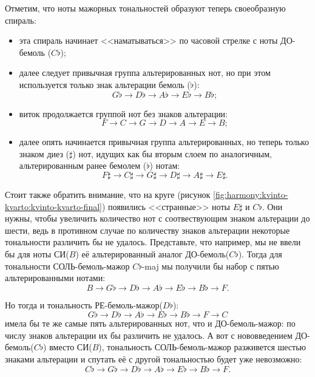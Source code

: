 Отметим, что ноты мажорных тональностей образуют теперь своеобразную спираль: 
\begin{itemize}
    \item эта спираль начинает <<наматываться>> по часовой стрелке с ноты ДО-бемоль ($C\flat$);
    
    \item далее следует привычная группа альтерированных нот, но при этом используется только знак альтерации бемоль ($\flat$):
    \[
        {G\flat}\rightarrow
        {D\flat}\rightarrow
        {A\flat}\rightarrow
        {E\flat}\rightarrow
        {B\flat};
    \]
    
    \item виток продолжается группой нот без знаков альтерации:
    \[
        F\rightarrow
        C\rightarrow
        G\rightarrow
        D\rightarrow
        A\rightarrow
        E\rightarrow
        B;
    \]
    
    \item далее опять начинается привычная группа альтерированных, но теперь только знаком диез ($\sharp$) нот, идущих как бы вторым слоем по аналогичным, альтерированным ранее бемолем ($\flat$) нотам: 
    \[
        {F\sharp}\rightarrow
        {C\sharp}\rightarrow
        {G\sharp}\rightarrow
        {D\sharp}\rightarrow
        {A\sharp}\rightarrow
        {E\sharp}.
    \]
\end{itemize}

Стоит также обратить внимание, что на круге (рисунок \ref{fig:harmony:kvinto-kvarto:kvinto-kvarto-final}) появились <<странные>> ноты $E\sharp$ и $C\flat$. Они нужны, чтобы увеличить количество нот с соотвествующим знаком альтерации до шести, ведь в противном случае по количеству знаков альтерации некоторые тональности различить бы не удалось. Представьте, что например, мы не ввели бы для ноты СИ($B$) её альтерированный аналог ДО-бемоль($C\flat$). Тогда для тональности СОЛЬ-бемоль-мажор $C\flat$-maj мы получили бы набор с пятью альтерированными нотами:
\[
    B\rightarrow
    {G\flat}\rightarrow
    {D\flat}\rightarrow
    {A\flat}\rightarrow
    {E\flat}\rightarrow
    {B\flat}\rightarrow
    F.
\]

Но тогда и тональность РЕ-бемоль-мажор($D\flat$):
\[
    {G\flat}\rightarrow
    {D\flat}\rightarrow
    {A\flat}\rightarrow
    {E\flat}\rightarrow
    {B\flat}\rightarrow
    F\rightarrow
    C
\]
имела бы те же самые пять альтерированных нот, что и ДО-бемоль-мажор: по числу знаков альтерации их бы различить не удалось. А вот с нововведением ДО-бемоль($C\flat$) вместо СИ($B$), тональность СОЛЬ-бемоль-мажор разживется шестью знаками альтерации и спутать её с другой тональностью будет уже невозможно:
\[
    {C\flat}\rightarrow
    {G\flat}\rightarrow
    {D\flat}\rightarrow
    {A\flat}\rightarrow
    {E\flat}\rightarrow
    {B\flat}\rightarrow
    F.
\]

